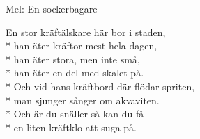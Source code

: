 \begin{SongText}[Kräftälskaren]
    \begin{SongInfo}
        Mel: En sockerbagare
    \end{SongInfo}
    \begin{SongVerse}
        En stor kräftälskare här bor i staden,\\*%
        han äter kräftor mest hela dagen,\\*%
        han äter stora, men inte små,\\*%
        han äter en del med skalet på.\\*%
        Och vid hans kräftbord där flödar spriten,\\*%
        man sjunger sånger om akvaviten.\\*%
        Och är du snäller så kan du få\\*%
        en liten kräftklo att suga på.
    \end{SongVerse}
\end{SongText}
